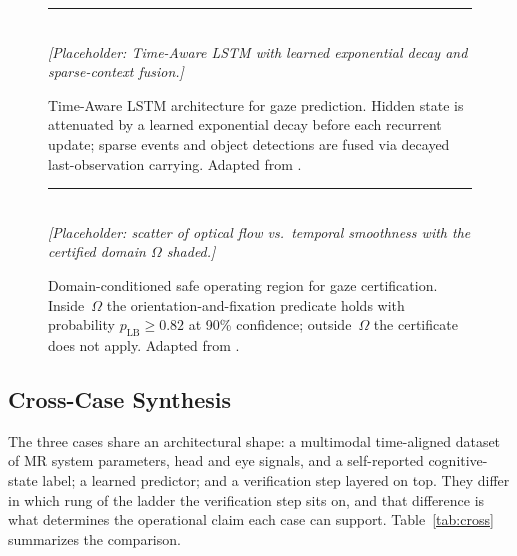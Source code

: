 \documentclass[graybox]{svmult}
\begin{document}
\begin{figure}[t]
\centering
\rule{0.9\textwidth}{0.5pt}\\[0.5em]
\textit{[Placeholder: Time-Aware LSTM with learned exponential decay and sparse-context fusion.]}
\caption{Time-Aware LSTM architecture for gaze prediction. Hidden state is attenuated by a learned exponential decay before each recurrent update; sparse events and object detections are fused via decayed last-observation carrying. Adapted from \citet{gaze2025reliability}.}
\label{fig:gaze-arch}
\end{figure}

\begin{figure}[t]
\centering
\rule{0.7\textwidth}{0.5pt}\\[0.5em]
\textit{[Placeholder: scatter of optical flow vs.\ temporal smoothness with the certified domain $\Omega$ shaded.]}
\caption{Domain-conditioned safe operating region for gaze certification. Inside~$\Omega$ the orientation-and-fixation predicate holds with probability $p_{\text{LB}}\geq 0.82$ at 90\% confidence; outside~$\Omega$ the certificate does not apply. Adapted from \citet{gaze2025reliability}.}
\label{fig:gaze-domain}
\end{figure}



\subsection{Cross-Case Synthesis}
\label{sec:comparison}

The three cases share an architectural shape: a multimodal time-aligned dataset of MR system parameters, head and eye signals, and a self-reported cognitive-state label; a learned predictor; and a verification step layered on top. They differ in which rung of the ladder the verification step sits on, and that difference is what determines the operational claim each case can support. Table~\ref{tab:cross} summarizes the comparison.
\end{document}
